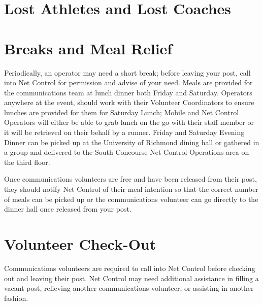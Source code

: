 \documentclass[pdflatex,letterpaper,twoside,12pt]{book}
\begin{document}

\section{Lost Athletes and Lost Coaches}


\section{Breaks and Meal Relief}

Periodically, an operator may need a short break; before leaving your post, call into Net Control for permission and advise of your need.  Meals are provided for the communications team at lunch dinner both Friday and Saturday.  Operators anywhere at the event, should work with their Volunteer Coordinators to ensure lunches are provided for them for Saturday Lunch; Mobile and Net Control Operators will either be able to grab lunch on the go with their staff member or it will be retrieved on their behalf by a runner.  Friday and Saturday Evening Dinner can be picked up at the University of Richmond dining hall or gathered in a group and delivered to the South Concourse Net Control Operations area on the third floor.

Once communications volunteers are free and have been released from their post, they should notify Net Control of their meal intention so that the correct number of meals can be picked up or the communications volunteer can go directly to the dinner hall once released from your post.


\section{Volunteer Check-Out}

Communications volunteers are required to call into Net Control before checking out and leaving their post. Net Control may need additional assistance in filling a vacant post, relieving another communications volunteer, or assisting in another fashion.
\end{document}
